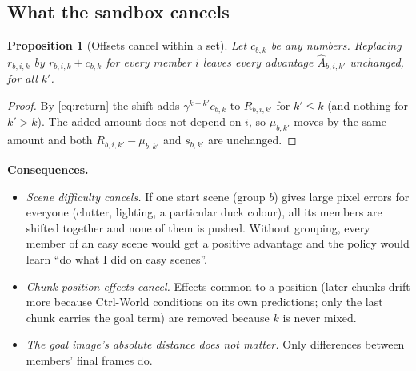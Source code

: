 \documentclass[11pt,a4paper]{article}
\newcommand{\Ah}{\hat A}
\newtheorem{proposition}{Proposition}
\theoremstyle{remark}
\begin{document}
\subsection{What the sandbox cancels}
\begin{proposition}[Offsets cancel within a set]\label{prop:shift}
Let $c_{b,k}$ be any numbers. Replacing $r_{b,i,k}$ by $r_{b,i,k}+c_{b,k}$ for every member $i$ leaves every advantage $\Ah_{b,i,k'}$ unchanged, for all $k'$.
\end{proposition}
\begin{proof}
By \eqref{eq:return} the shift adds $\gamma^{k-k'}c_{b,k}$ to $R_{b,i,k'}$ for $k'\le k$ (and nothing for $k'>k$). The added amount does not depend on $i$, so $\mu_{b,k'}$ moves by the same amount and both $R_{b,i,k'}-\mu_{b,k'}$ and $s_{b,k'}$ are unchanged.
\end{proof}
\textbf{Consequences.}
\begin{itemize}
\item \emph{Scene difficulty cancels.} If one start scene (group $b$) gives large pixel errors for everyone (clutter, lighting, a particular duck colour), all its members are shifted together and none of them is pushed. Without grouping, every member of an easy scene would get a positive advantage and the policy would learn ``do what I did on easy scenes''.
\item \emph{Chunk-position effects cancel.} Effects common to a position (later chunks drift more because Ctrl-World conditions on its own predictions; only the last chunk carries the goal term) are removed because $k$ is never mixed.
\item \emph{The goal image's absolute distance does not matter.} Only differences between members' final frames do.
\end{itemize}
\end{document}
